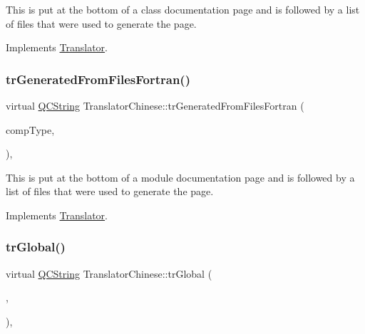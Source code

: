This is put at the bottom of a class documentation page and is followed by a list of files that were used to generate the page. 

Implements \mbox{\hyperlink{class_translator}{Translator}}.

\mbox{\label{class_translator_chinese_a876cf8b6a040eaeb0bb4be19151087c5}} 
\subsubsection{\texorpdfstring{trGeneratedFromFilesFortran()}{trGeneratedFromFilesFortran()}}
{\footnotesize\ttfamily virtual \mbox{\hyperlink{class_q_c_string}{Q\+C\+String}} Translator\+Chinese\+::tr\+Generated\+From\+Files\+Fortran (\begin{DoxyParamCaption}\item[{\mbox{\hyperlink{class_class_def_ae70cf86d35fe954a94c566fbcfc87939}{Class\+Def\+::\+Compound\+Type}}}]{comp\+Type,  }\item[{bool}]{ }\end{DoxyParamCaption})\hspace{0.3cm}{\ttfamily [inline]}, {\ttfamily [virtual]}}

This is put at the bottom of a module documentation page and is followed by a list of files that were used to generate the page. 

Implements \mbox{\hyperlink{class_translator}{Translator}}.

\mbox{\label{class_translator_chinese_a2c90fe3ee18b178138d85e82085010d1}} 
\subsubsection{\texorpdfstring{trGlobal()}{trGlobal()}}
{\footnotesize\ttfamily virtual \mbox{\hyperlink{class_q_c_string}{Q\+C\+String}} Translator\+Chinese\+::tr\+Global (\begin{DoxyParamCaption}\item[{bool}]{,  }\item[{bool}]{ }\end{DoxyParamCaption})\hspace{0.3cm}{\ttfamily [inline]}, {\ttfamily [virtual]}}

